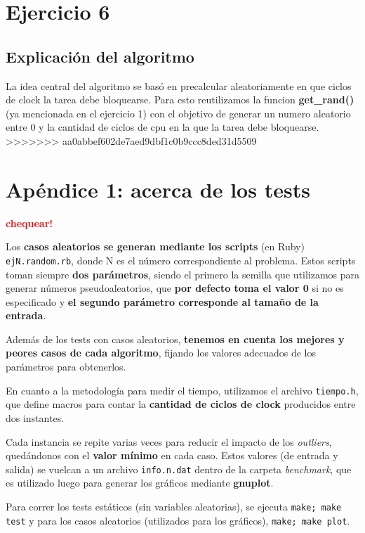 \documentclass[a4paper]{article}
\begin{document}
\section{Ejercicio 6}

\subsection{Explicación del algoritmo}
La idea central del algoritmo se basó en precalcular aleatoriamente en que
ciclos de clock la tarea debe bloquearse. Para esto reutilizamos la funcion
\textbf{get\_rand()} (ya mencionada en el ejercicio 1) con el objetivo de
generar un numero aleatorio entre 0 y la cantidad de ciclos de cpu en la que
la tarea debe bloquearse.
>>>>>>> aa0abbef602de7aed9dbf1c0b9ccc8ded31d5509

\newpage

\section{Apéndice 1: acerca de los tests}


\textcolor{red}{\textbf{chequear!}} \medskip

Los \textbf{casos aleatorios se generan mediante los scripts} (en Ruby) \verb|ejN.random.rb|, donde
N es el número correspondiente al problema. Estos scripts toman siempre \textbf{dos parámetros},
siendo el primero la semilla que utilizamos para generar números pseudoaleatorios, que
\textbf{por defecto toma el valor 0} si no es especificado y \textbf{el segundo parámetro corresponde
al tamaño de la entrada}.

Además de los tests con casos aleatorios, \textbf{tenemos en cuenta los mejores y peores
casos de cada algoritmo}, fijando los valores adecuados de los parámetros para
obtenerlos. \medskip

En cuanto a la metodología para medir el tiempo, utilizamos el archivo \verb|tiempo.h|,
que define macros para contar la \textbf{cantidad de ciclos de clock} producidos entre dos instantes. \medskip

Cada instancia se repite varias veces para reducir el impacto de los \textit{outliers}, quedándonos
con el \textbf{valor mínimo} en cada caso. Estos valores (de entrada y salida) se vuelcan a un archivo
\verb|info.n.dat| dentro de la carpeta \textit{benchmark}, que es utilizado luego para generar los gráficos
mediante \textbf{gnuplot}. \medskip

Para correr los tests estáticos (sin variables aleatorias), se ejecuta \verb|make; make test| y para los
casos aleatorios (utilizados para los gráficos), \verb|make; make plot|.
\end{document}

